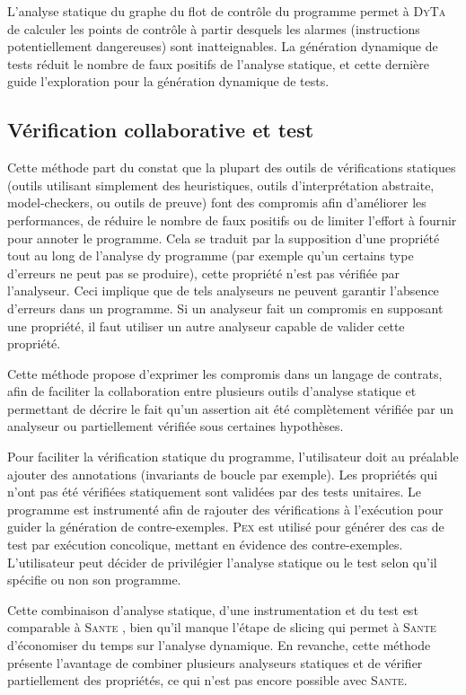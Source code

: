 \documentclass[french]{spimufcphdthesis}
\begin{document}
L'analyse statique du graphe du flot de contrôle du programme permet à
\textsc{DyTa} de calculer les points de contrôle à partir desquels les alarmes
(instructions potentiellement dangereuses) sont inatteignables. La génération
dynamique de tests réduit le nombre de faux positifs de l'analyse statique, et
cette dernière guide l'exploration pour la génération dynamique de tests.

\subsection{Vérification collaborative et test}

Cette méthode \cite{collaborative-verification} part du constat que la plupart
des outils de vérifications statiques (outils utilisant simplement des
heuristiques, outils d'interprétation abstraite, model-checkers, ou outils de
preuve) font des compromis afin d'améliorer les performances, de réduire le
nombre de faux positifs ou de limiter l'effort à fournir pour annoter le
programme. Cela se traduit par la supposition d'une propriété tout au long de
l'analyse dy programme (par exemple qu'un certains type d'erreurs ne peut pas
se produire), cette propriété n'est pas vérifiée par l'analyseur. Ceci
implique que de tels analyseurs ne peuvent garantir l'absence d'erreurs dans un
programme. Si un analyseur fait un compromis en supposant une propriété, il
faut utiliser un autre analyseur capable de valider cette propriété.

Cette méthode propose d'exprimer les compromis dans un langage de contrats,
afin de faciliter la collaboration entre plusieurs outils d'analyse statique
et permettant de décrire le fait qu'un assertion ait été complètement vérifiée
par un analyseur ou partiellement vérifiée sous certaines hypothèses.

Pour faciliter la vérification statique du programme, l'utilisateur doit au
préalable ajouter des annotations (invariants de boucle par exemple). Les
propriétés qui n'ont pas été vérifiées statiquement sont validées par des tests
unitaires. Le programme est instrumenté afin de rajouter des vérifications à
l'exécution pour guider la génération de contre-exemples. \textsc{Pex}
\cite{PEX} est utilisé pour générer des cas de test par exécution concolique,
mettant en évidence des contre-exemples. L'utilisateur peut décider de
privilégier l'analyse statique ou le test selon qu'il spécifie ou non son
programme.

Cette combinaison d'analyse statique, d'une instrumentation et du test est
comparable à \textsc{Sante} \cite{SANTE}, bien qu'il manque l'étape de slicing
qui permet à \textsc{Sante} d'économiser du temps sur l'analyse dynamique. En
revanche, cette méthode présente l'avantage de combiner plusieurs analyseurs
statiques et de vérifier partiellement des propriétés, ce qui n'est pas encore
possible avec \textsc{Sante}.
\end{document}
